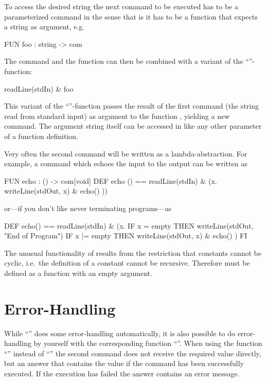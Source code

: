 To access the desired string the next command to be executed has to be
a parameterized command in the sense that is it has to
be a function that expects a string as argument, e.g.
\begin{prog}
        FUN foo : string -> com
\end{prog}

The  command  and the function  can then be
combined with a variant of the ``\pro{\&}''-function:
\begin{prog}
        readLine(stdIn) \& foo
\end{prog}
This variant of the  ``\pro{\&}''-function passes the result of the
first command (the string read from standard input) as argument to the
function , yielding a new command. 
The argument string itself can be accessed in  like any
other parameter of a function definition.
\medskip

Very often the second command will be written as a lambda-abstraction. 
For example, a command  which echoes the input to the output
can be written as
\begin{prog}
        FUN echo : () -> com[void]
        DEF echo () == readLine(stdIn)      \& (\LAMBDA x. 
                       writeLine(stdOut, x) \&
                       echo() ))
\end{prog}
or---if you don't like never terminating programs---as
\begin{prog}
        DEF echo() == 
              readLine(stdIn)               \& (\LAMBDA x. 
                IF x =  empty THEN writeLine(stdOut, "End of Program")
                IF x |= empty THEN writeLine(stdOut, x)  \& 
                                   echo() )
                FI
\end{prog}

The unusual functionality of  results from the restriction
that constants cannot be cyclic, i.e.~the definition of a constant
cannot be recursive.
Therefore  must be defined as a function with an empty
argument.


\section{Error-Handling}
\label{sec:ioerror}
\advanced While ``\pro{\&}'' does some error-handling automatically, it is
also possible to do error-handling by yourself with the corresponding
 function ``\pro{;}''.  When using the function
``\pro{;}'' instead of ``\pro{\&}'' the second command does not
receive the required value directly, but an answer that contains the
value if the command has been successfully executed.
 If the execution has failed the answer contains an error message.

